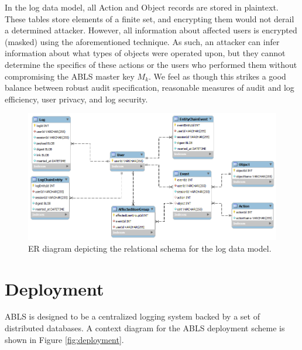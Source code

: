 \documentclass{sig-alternate}
\begin{document}
In the log data model, all Action and Object records are stored in plaintext. These tables store elements of a finite set, and
encrypting them would not derail a determined attacker. However, all information about affected users is encrypted 
(masked) using the aforementioned technique. As such, an attacker can infer
information about what types of objects were operated upon, but they cannot determine the specifics of these actions
or the users who performed them without compromising the ABLS master key $M_k$. We feel as though this strikes
a good balance between robust audit specification, reasonable measures of audit and log efficiency, user privacy, and log security. 

\begin{figure}[htb!]
\begin{center}
\includegraphics[width=5in]{images/logSchema.png}
\caption{ER diagram depicting the relational schema for the log data model.}
\label{fig:schema}
\end{center}
\end{figure}

\section{Deployment}
\label{sec:deployment}
ABLS is designed to be a centralized logging system backed by a set of distributed databases. A context
diagram for the ABLS deployment scheme is shown in Figure \ref{fig:deployment}.
\end{document}
